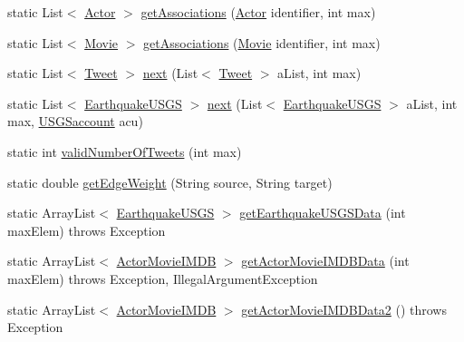 \begin{DoxyCompactItemize}
\item 
static List$<$ \hyperlink{classbridges_1_1data__src__dependent_1_1_actor}{Actor} $>$ \hyperlink{classbridges_1_1connect_1_1_data_formatter_a5e9f400a020b99e0bbba1fd5332a8f88}{get\+Associations} (\hyperlink{classbridges_1_1data__src__dependent_1_1_actor}{Actor} identifier, int max)
\item 
static List$<$ \hyperlink{classbridges_1_1data__src__dependent_1_1_movie}{Movie} $>$ \hyperlink{classbridges_1_1connect_1_1_data_formatter_ad0377b692c07836fb1016e5fb296e79c}{get\+Associations} (\hyperlink{classbridges_1_1data__src__dependent_1_1_movie}{Movie} identifier, int max)
\item 
static List$<$ \hyperlink{classbridges_1_1data__src__dependent_1_1_tweet}{Tweet} $>$ \hyperlink{classbridges_1_1connect_1_1_data_formatter_a3d0b2d2e0384d2a537bb61fbeb3d00a4}{next} (List$<$ \hyperlink{classbridges_1_1data__src__dependent_1_1_tweet}{Tweet} $>$ a\+List, int max)
\item 
static List$<$ \hyperlink{classbridges_1_1data__src__dependent_1_1_earthquake_u_s_g_s}{Earthquake\+U\+S\+G\+S} $>$ \hyperlink{classbridges_1_1connect_1_1_data_formatter_ad451dd96b927702127d383e85fc98661}{next} (List$<$ \hyperlink{classbridges_1_1data__src__dependent_1_1_earthquake_u_s_g_s}{Earthquake\+U\+S\+G\+S} $>$ a\+List, int max, \hyperlink{classbridges_1_1data__src__dependent_1_1_u_s_g_saccount}{U\+S\+G\+Saccount} acu)
\item 
static int \hyperlink{classbridges_1_1connect_1_1_data_formatter_ad17084ac8b0f28837ebb1d77905cefb8}{valid\+Number\+Of\+Tweets} (int max)
\item 
static double \hyperlink{classbridges_1_1connect_1_1_data_formatter_a2637c733e7f4efccfb56de0940506318}{get\+Edge\+Weight} (String source, String target)
\item 
static Array\+List$<$ \hyperlink{classbridges_1_1data__src__dependent_1_1_earthquake_u_s_g_s}{Earthquake\+U\+S\+G\+S} $>$ \hyperlink{classbridges_1_1connect_1_1_data_formatter_a31f1f3e398fbf7225c790dbbbde238dd}{get\+Earthquake\+U\+S\+G\+S\+Data} (int max\+Elem)  throws Exception 
\item 
static Array\+List$<$ \hyperlink{classbridges_1_1data__src__dependent_1_1_actor_movie_i_m_d_b}{Actor\+Movie\+I\+M\+D\+B} $>$ \hyperlink{classbridges_1_1connect_1_1_data_formatter_aa2a84fe044615b2e1b166d412babac0f}{get\+Actor\+Movie\+I\+M\+D\+B\+Data} (int max\+Elem)  throws Exception, Illegal\+Argument\+Exception 
\item 
static Array\+List$<$ \hyperlink{classbridges_1_1data__src__dependent_1_1_actor_movie_i_m_d_b}{Actor\+Movie\+I\+M\+D\+B} $>$ \hyperlink{classbridges_1_1connect_1_1_data_formatter_a9b599616c4d7a502f9fab8663173db6d}{get\+Actor\+Movie\+I\+M\+D\+B\+Data2} ()  throws Exception 

\end{DoxyCompactItemize}
